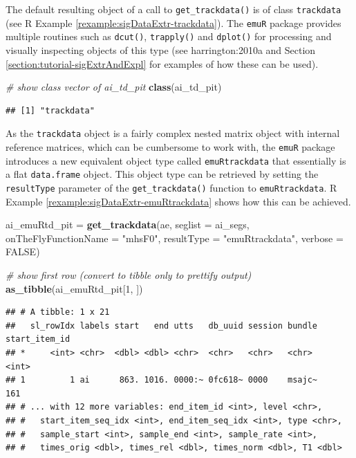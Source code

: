 \documentclass[]{book}
\newenvironment{Shaded}{\begin{snugshade}}{\end{snugshade}}
\newcommand{\CommentTok}[1]{\textcolor[rgb]{0.56,0.35,0.01}{\textit{#1}}}
\newcommand{\DataTypeTok}[1]{\textcolor[rgb]{0.13,0.29,0.53}{#1}}
\newcommand{\DecValTok}[1]{\textcolor[rgb]{0.00,0.00,0.81}{#1}}
\newcommand{\KeywordTok}[1]{\textcolor[rgb]{0.13,0.29,0.53}{\textbf{#1}}}
\newcommand{\NormalTok}[1]{#1}
\newcommand{\OtherTok}[1]{\textcolor[rgb]{0.56,0.35,0.01}{#1}}
\newcommand{\StringTok}[1]{\textcolor[rgb]{0.31,0.60,0.02}{#1}}
\theoremstyle{definition}
\theoremstyle{definition}
\theoremstyle{definition}
\theoremstyle{remark}
\begin{document}
The default resulting object of a call to \texttt{get\_trackdata()} is
of class \texttt{trackdata} (see R Example
\ref{rexample:sigDataExtr-trackdata}). The \texttt{emuR} package
provides multiple routines such as \texttt{dcut()}, \texttt{trapply()}
and \texttt{dplot()} for processing and visually inspecting objects of
this type (see harrington:2010a and Section
\ref{section:tutorial-sigExtrAndExpl} for examples of how these can be
used).

\begin{Shaded}
\begin{Highlighting}[]
\CommentTok{# show class vector of ai_td_pit}
\KeywordTok{class}\NormalTok{(ai_td_pit)}
\end{Highlighting}
\end{Shaded}

\begin{verbatim}
## [1] "trackdata"
\end{verbatim}

As the \texttt{trackdata} object is a fairly complex nested matrix
object with internal reference matrices, which can be cumbersome to work
with, the \texttt{emuR} package introduces a new equivalent object type
called \texttt{emuRtrackdata} that essentially is a flat
\texttt{data.frame} object. This object type can be retrieved by setting
the \texttt{resultType} parameter of the \texttt{get\_trackdata()}
function to \texttt{emuRtrackdata}. R Example
\ref{rexample:sigDataExtr-emuRtrackdata} shows how this can be achieved.

\begin{Shaded}
\begin{Highlighting}[]
\NormalTok{ai_emuRtd_pit =}\StringTok{ }\KeywordTok{get_trackdata}\NormalTok{(ae,}
                              \DataTypeTok{seglist =}\NormalTok{ ai_segs,}
                              \DataTypeTok{onTheFlyFunctionName =} \StringTok{"mhsF0"}\NormalTok{,}
                              \DataTypeTok{resultType =} \StringTok{"emuRtrackdata"}\NormalTok{,}
                              \DataTypeTok{verbose =} \OtherTok{FALSE}\NormalTok{)}

\CommentTok{# show first row (convert to tibble only to prettify output)}
\KeywordTok{as_tibble}\NormalTok{(ai_emuRtd_pit[}\DecValTok{1}\NormalTok{, ])}
\end{Highlighting}
\end{Shaded}

\begin{verbatim}
## # A tibble: 1 x 21
##   sl_rowIdx labels start   end utts   db_uuid session bundle start_item_id
## *     <int> <chr>  <dbl> <dbl> <chr>  <chr>   <chr>   <chr>          <int>
## 1         1 ai      863. 1016. 0000:~ 0fc618~ 0000    msajc~           161
## # ... with 12 more variables: end_item_id <int>, level <chr>,
## #   start_item_seq_idx <int>, end_item_seq_idx <int>, type <chr>,
## #   sample_start <int>, sample_end <int>, sample_rate <int>,
## #   times_orig <dbl>, times_rel <dbl>, times_norm <dbl>, T1 <dbl>
\end{verbatim}
\end{document}
